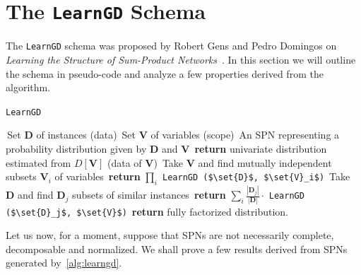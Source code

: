 \documentclass{amsart}
\theoremstyle{plain}
\numberwithin{equation}{section}
\newcommand{\set}[1]{\mathbf{#1}}
\newcommand{\code}[1]{\lstinline[mathescape=true]{#1}}
\newcommand{\mcode}[1]{\lstinline[mathescape]!#1!}
\begin{document}
\section{The \code{LearnGD} Schema}

The \code{LearnGD} schema was proposed by Robert Gens and Pedro Domingos on \textit{Learning the
Structure of Sum-Product Networks}~\cite{gens-domingos}. In this section we will outline the schema
in pseudo-code and analyze a few properties derived from the algorithm.

\begin{algorithm}[H]
  \caption{\code{LearnGD}}\label{alg:learngd}
  \begin{algorithmic}[1]
    \Require\,Set $\mathbf{D}$ of instances (data)
    \Require\,Set $\mathbf{V}$ of variables (scope)
    \Ensure\,An SPN representing a probability distribution given by $\mathbf{D}$ and $\mathbf{V}$
    \If{$|\set{V}|=1$} 
      \State\,\textbf{return} univariate distribution estimated from $D[\set{V}]$ (data of
        $\set{V}$)
    \EndIf%
    \State\,Take $\set{V}$ and find mutually independent subsets $\set{V}_i$ of variables
     
      \State\,\textbf{return} $\prod_i$ \mcode{LearnGD ($\set{D}$, $\set{V}_i$)}
    \Else{}
      \State\,Take $\set{D}$ and find $\set{D}_j$ subsets of similar instances
        \State\,\textbf{return} $\sum_i \frac{|\set{D}_j|}{|\set{D}|} \cdot$ \mcode{LearnGD
        ($\set{D}_j$, $\set{V}$)}
      \Else{}
        \State\,\textbf{return} fully factorized distribution.
      \EndIf%
    \EndIf%
  \end{algorithmic}
\end{algorithm}

Let us now, for a moment, suppose that SPNs are not necessarily complete, decomposable and
normalized. We shall prove a few results derived from SPNs generated by~\autoref{alg:learngd}.
\end{document}

